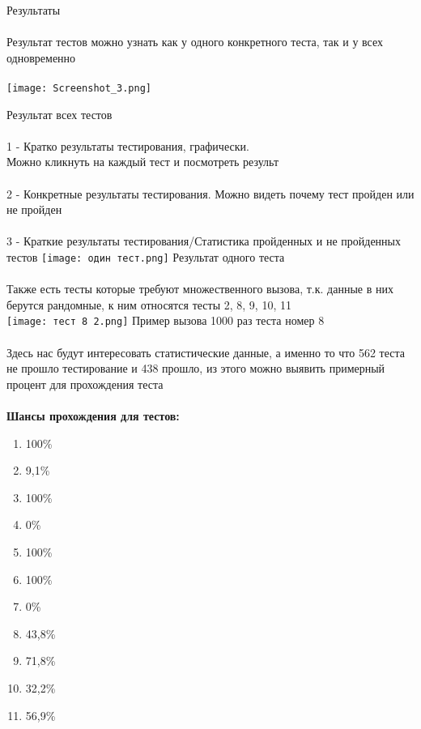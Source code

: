 \documentclass{article}
\begin{document}
\newpage
\huge{Результаты} \\ \\
\Large{Результат тестов можно узнать как у одного конкретного теста, так и у всех одновременно}
\\ \\
\texttt{[image: Screenshot\_3.png]}

\Large{Результат всех тестов}
\\ \\
1 - Кратко результаты тестирования, графически. \\ Можно кликнуть на каждый тест и посмотреть результ
\\ \\
2 - Конкретные результаты тестирования. Можно видеть почему тест пройден или не пройден
\\ \\
3 - Краткие результаты тестирования/Статистика пройденных и не пройденных тестов
\newpage
\texttt{[image: один тест.png]}
\Large{Результат одного теста}
\\ \\
Также есть тесты которые требуют множественного вызова, т.к. данные в них берутся рандомные, к ним относятся тесты 2, 8, 9, 10, 11
\\
\texttt{[image: тест 8 2.png]}
Пример вызова 1000 раз теста номер 8
\\ \\ Здесь нас будут интересовать статистические данные, а именно то что 562 теста не прошло тестирование и 438 прошло, из этого можно выявить примерный процент для прохождения теста
\\ \\
\newpage
\Huge{\textbf{Шансы прохождения для тестов:}}
\begin{enumerate}
    \item 100\%
    \item 9,1\%
    \item 100\%
    \item 0\%
    \item 100\%
    \item 100\%
    \item 0\%
    \item 43,8\%
    \item 71,8\%
    \item 32,2\%
    \item 56,9\%
\end{enumerate}
\end{document}
